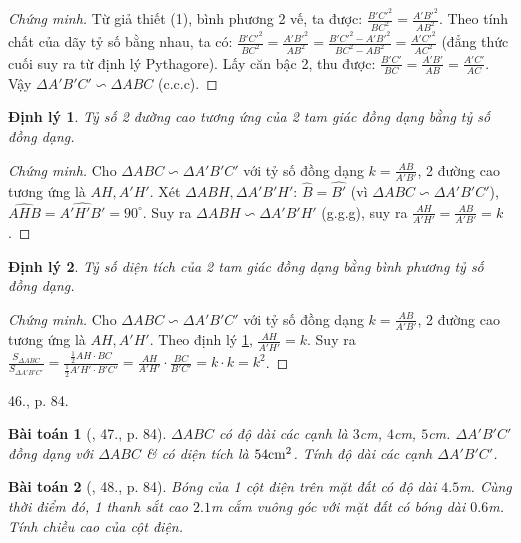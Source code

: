 \documentclass{article}
\newtheorem{baitoan}{Bài toán}
\newtheorem{dinhly}{Định lý}
\begin{document}
\begin{proof}[Chứng minh]
	Từ giả thiết (1), bình phương 2 vế, ta được: $\frac{B'C'^2}{BC^2} = \frac{A'B'^2}{AB^2}$. Theo tính chất của dãy tỷ số bằng nhau, ta có: $\frac{B'C'^2}{BC^2} = \frac{A'B'^2}{AB^2} = \frac{B'C'^2 - A'B'^2}{BC^2 - AB^2} = \frac{A'C'^2}{AC^2}$ (đẳng thức cuối suy ra từ định lý Pythagore). Lấy căn bậc 2, thu được: $\frac{B'C'}{BC} = \frac{A'B'}{AB} = \frac{A'C'}{AC}$. Vậy $\Delta A'B'C'\backsim\Delta ABC$ (c.c.c).
\end{proof}

\begin{dinhly}
	\label{thm: heights of congruent triangles}
	Tỷ số 2 đường cao tương ứng của 2 tam giác đồng dạng bằng tỷ số đồng dạng.
\end{dinhly}

\begin{proof}[Chứng minh]
	Cho $\Delta ABC\backsim\Delta A'B'C'$ với tỷ số đồng dạng $k = \frac{AB}{A'B'}$, 2 đường cao tương ứng là $AH,A'H'$. Xét $\Delta ABH,\Delta A'B'H'$: $\widehat{B} = \widehat{B'}$ (vì $\Delta ABC\backsim\Delta A'B'C'$), $\widehat{AHB} = \widehat{A'H'B'} = 90^\circ$. Suy ra $\Delta ABH\backsim\Delta A'B'H'$ (g.g.g), suy ra $\frac{AH}{A'H'} = \frac{AB}{A'B'} = k$.
\end{proof}

\begin{dinhly}
	Tỷ số diện tích của 2 tam giác đồng dạng bằng bình phương tỷ số đồng dạng.
\end{dinhly}

\begin{proof}[Chứng minh]
	Cho $\Delta ABC\backsim\Delta A'B'C'$ với tỷ số đồng dạng $k = \frac{AB}{A'B'}$, 2 đường cao tương ứng là $AH,A'H'$. Theo định lý \ref{thm: heights of congruent triangles}, $\frac{AH}{A'H'} = k$. Suy ra $\frac{S_{\Delta ABC}}{S_{\Delta A'B'C'}} = \frac{\frac{1}{2}AH\cdot BC}{\frac{1}{2}A'H'\cdot B'C'} = \frac{AH}{A'H'}\cdot\frac{BC}{B'C'} = k\cdot k = k^2$.
\end{proof}
46., p. 84.

\begin{baitoan}[\cite{SGK_Toan_8_tap_2}, 47., p. 84]
	$\Delta ABC$ có độ dài các cạnh là $3$\emph{cm}, $4$\emph{cm}, $5$\emph{cm}. $\Delta A'B'C'$ đồng dạng với $\Delta ABC$ \& có diện tích là $54{\rm cm}^2$. Tính độ dài các cạnh $\Delta A'B'C'$.
\end{baitoan}

\begin{baitoan}[\cite{SGK_Toan_8_tap_2}, 48., p. 84]
	Bóng của 1 cột điện trên mặt đất có độ dài $4.5$\emph{m}. Cùng thời điểm đó, 1 thanh sắt cao $2.1$\emph{m} cắm vuông góc với mặt đất có bóng dài $0.6$\emph{m}. Tính chiều cao của cột điện.
\end{baitoan}
\end{document}
